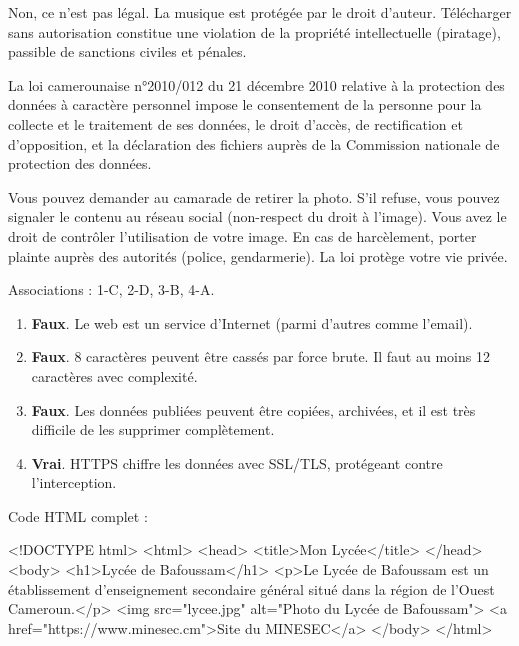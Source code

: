 Non, ce n'est pas légal. La musique est protégée par le droit d'auteur. Télécharger sans autorisation constitue une violation de la propriété intellectuelle (piratage), passible de sanctions civiles et pénales.

La loi camerounaise n°2010/012 du 21 décembre 2010 relative à la protection des données à caractère personnel impose le consentement de la personne pour la collecte et le traitement de ses données, le droit d'accès, de rectification et d'opposition, et la déclaration des fichiers auprès de la Commission nationale de protection des données.

Vous pouvez demander au camarade de retirer la photo. S'il refuse, vous pouvez signaler le contenu au réseau social (non-respect du droit à l'image). Vous avez le droit de contrôler l'utilisation de votre image. En cas de harcèlement, porter plainte auprès des autorités (police, gendarmerie). La loi protège votre vie privée.

Associations : 1-C, 2-D, 3-B, 4-A.

\begin{enumerate}
    \item \textbf{Faux}. Le web est un service d'Internet (parmi d'autres comme l'email).
    \item \textbf{Faux}. 8 caractères peuvent être cassés par force brute. Il faut au moins 12 caractères avec complexité.
    \item \textbf{Faux}. Les données publiées peuvent être copiées, archivées, et il est très difficile de les supprimer complètement.
    \item \textbf{Vrai}. HTTPS chiffre les données avec SSL/TLS, protégeant contre l'interception.
\end{enumerate}

Code HTML complet :
\begin{ccode}
<!DOCTYPE html>
<html>
  <head>
    <title>Mon Lycée</title>
  </head>
  <body>
    <h1>Lycée de Bafoussam</h1>
    <p>Le Lycée de Bafoussam est un établissement d'enseignement secondaire général situé dans la région de l'Ouest Cameroun.</p>
    <img src="lycee.jpg" alt="Photo du Lycée de Bafoussam">
    <a href="https://www.minesec.cm">Site du MINESEC</a>
  </body>
</html>
\end{ccode}

